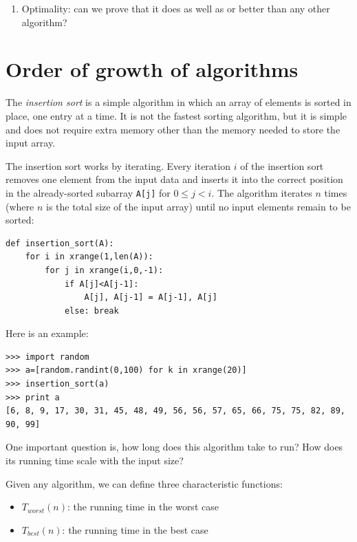 \documentclass[justified,sixbynine]{tufte-book}
\def\ft{\small\tt}
\theoremstyle{plain}%
\theoremstyle{definition}
\theoremstyle{remark}
\begin{document}
\begin{fullwidth}
\begin{enumerate}
\item  Optimality: can we prove that it does as well as or better than any other algorithm?
\end{enumerate}

\goodbreak\section{Order of growth of algorithms}

\index{$\Theta$}\index{$\Omega$}\index{$\omega$}


The {\it insertion sort} is a simple algorithm in which an array of elements is sorted in place, one entry at a time. It is not the fastest sorting algorithm, but it is simple and does not require extra memory other than the memory needed to store the input array.

The insertion sort works by iterating. Every iteration $i$ of the insertion sort removes one element from the input data and inserts it into the correct position in the already-sorted subarray {\ft A[j]} for $0 \le j < i$. The algorithm iterates $n$ times (where $n$ is the total size of the input array) until no input elements remain to be sorted:

\begin{lstlisting}
def insertion_sort(A):
    for i in xrange(1,len(A)):
        for j in xrange(i,0,-1):
            if A[j]<A[j-1]:
                A[j], A[j-1] = A[j-1], A[j]
            else: break
\end{lstlisting}

Here is an example:

\begin{lstlisting}
>>> import random
>>> a=[random.randint(0,100) for k in xrange(20)]
>>> insertion_sort(a)
>>> print a
[6, 8, 9, 17, 30, 31, 45, 48, 49, 56, 56, 57, 65, 66, 75, 75, 82, 89, 90, 99]
\end{lstlisting}

One important question is, how long does this algorithm take to run? How does its running time scale with the input size?

Given any algorithm, we can define three characteristic functions:

\begin{itemize}
\item  $T_{worst}(n)$: the running time in the worst case

\item  $T_{best}(n)$: the running time in the best case


\end{itemize}
\end{fullwidth}
\end{document}
